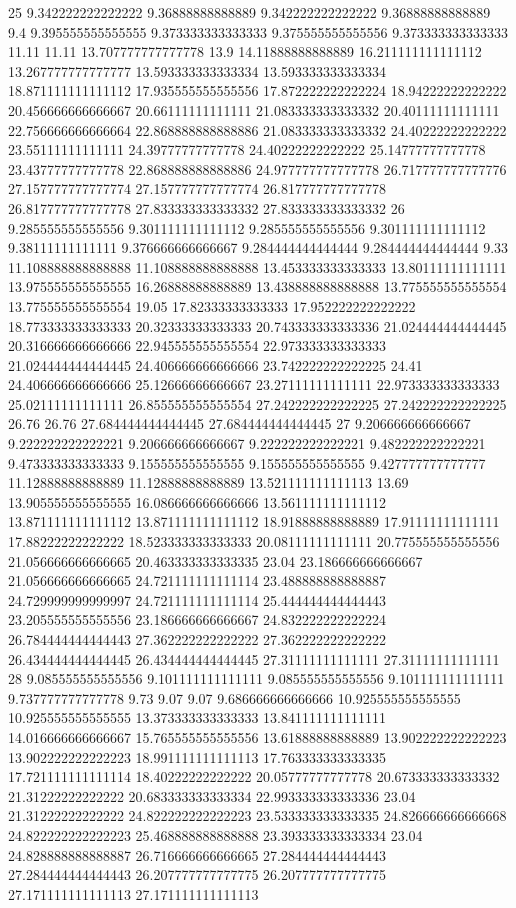 25 9.342222222222222 9.36888888888889 9.342222222222222 9.36888888888889 9.4 9.395555555555555 9.373333333333333 9.375555555555556 9.373333333333333 11.11 11.11 13.707777777777778 13.9 14.11888888888889 16.211111111111112 13.267777777777777 13.593333333333334 13.593333333333334 18.871111111111112 17.935555555555556 17.872222222222224 18.94222222222222 20.456666666666667 20.66111111111111 21.083333333333332 20.40111111111111 22.756666666666664 22.868888888888886 21.083333333333332 24.40222222222222 23.55111111111111 24.39777777777778 24.40222222222222 25.14777777777778 23.43777777777778 22.868888888888886 24.977777777777778 26.717777777777776 27.157777777777774 27.157777777777774 26.817777777777778 26.817777777777778 27.833333333333332 27.833333333333332
26 9.285555555555556 9.301111111111112 9.285555555555556 9.301111111111112 9.38111111111111 9.376666666666667 9.284444444444444 9.284444444444444 9.33 11.108888888888888 11.108888888888888 13.453333333333333 13.80111111111111 13.975555555555555 16.26888888888889 13.438888888888888 13.775555555555554 13.775555555555554 19.05 17.82333333333333 17.952222222222222 18.773333333333333 20.32333333333333 20.743333333333336 21.024444444444445 20.316666666666666 22.945555555555554 22.973333333333333 21.024444444444445 24.406666666666666 23.742222222222225 24.41 24.406666666666666 25.12666666666667 23.27111111111111 22.973333333333333 25.02111111111111 26.855555555555554 27.242222222222225 27.242222222222225 26.76 26.76 27.684444444444445 27.684444444444445
27 9.206666666666667 9.222222222222221 9.206666666666667 9.222222222222221 9.482222222222221 9.473333333333333 9.155555555555555 9.155555555555555 9.427777777777777 11.12888888888889 11.12888888888889 13.521111111111113 13.69 13.905555555555555 16.086666666666666 13.561111111111112 13.871111111111112 13.871111111111112 18.91888888888889 17.91111111111111 17.88222222222222 18.523333333333333 20.08111111111111 20.775555555555556 21.056666666666665 20.463333333333335 23.04 23.186666666666667 21.056666666666665 24.721111111111114 23.488888888888887 24.729999999999997 24.721111111111114 25.444444444444443 23.205555555555556 23.186666666666667 24.832222222222224 26.784444444444443 27.362222222222222 27.362222222222222 26.434444444444445 26.434444444444445 27.31111111111111 27.31111111111111
28 9.085555555555556 9.101111111111111 9.085555555555556 9.101111111111111 9.737777777777778 9.73 9.07 9.07 9.686666666666666 10.925555555555555 10.925555555555555 13.373333333333333 13.841111111111111 14.016666666666667 15.765555555555556 13.61888888888889 13.902222222222223 13.902222222222223 18.991111111111113 17.763333333333335 17.721111111111114 18.40222222222222 20.05777777777778 20.673333333333332 21.31222222222222 20.683333333333334 22.993333333333336 23.04 21.31222222222222 24.822222222222223 23.533333333333335 24.826666666666668 24.822222222222223 25.468888888888888 23.393333333333334 23.04 24.828888888888887 26.716666666666665 27.284444444444443 27.284444444444443 26.207777777777775 26.207777777777775 27.171111111111113 27.171111111111113
